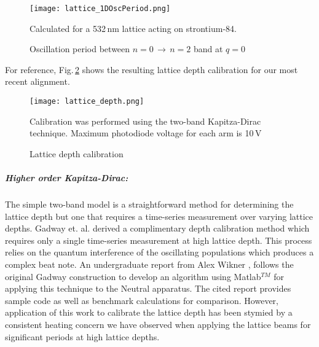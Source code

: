 	\begin{figure}
		\centerline{
		\texttt{[image: lattice\_1DOscPeriod.png]}}
		\caption{Oscillation period between $n=0\,\rightarrow\,n=2$ band at $q=0$}{Calculated for a 532\,nm lattice acting on strontium-84.}
		\label{fig:latOscPeriod}
	\end{figure} 
For reference, Fig.\,\ref{fig:latDepth} shows the resulting lattice depth calibration for our most recent alignment.
	\begin{figure} 
		\centerline{
		\texttt{[image: lattice\_depth.png]}}
		\caption{Lattice depth calibration}{Calibration was performed using the two-band Kapitza-Dirac technique. Maximum photodiode voltage for each arm is 10\,V}
		\label{fig:latDepth}
	\end{figure}
	
\subparagraph{Higher order Kapitza-Dirac:}
The simple two-band model is a straightforward method for determining the lattice depth but one that requires a time-series measurement over varying lattice depths.
Gadway et. al. \cite{Gadway2009} derived a complimentary depth calibration method which requires only a single time-series measurement at high lattice depth.
This process relies on the quantum interference of the oscillating populations which produces a complex beat note.
An undergraduate report from Alex Wikner \cite{Wikner2017}, follows the original Gadway construction to develop an algorithm using Matlab$^{TM}$ for applying this technique to the Neutral apparatus.
The cited report provides sample code as well as benchmark calculations for comparison.
However, application of this work to calibrate the lattice depth has been stymied by a consistent heating concern we have observed when applying the lattice beams for significant periods at high lattice depths.

